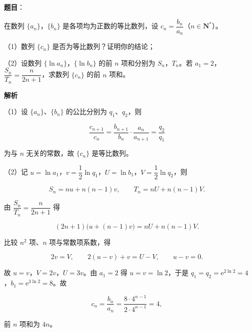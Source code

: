 \begin{answer}

\textbf{题目}：

在数列 $\{a_n\}$，$\{b_n\}$ 是各项均为正数的等比数列，设 $c_n=\dfrac{b_n}{a_n}$（$n\in\mathbf N^*$）。

（1）数列 $\{c_n\}$ 是否为等比数列？证明你的结论；

（2）设数列 $\{\ln a_n\}$，$\{\ln b_n\}$ 的前 $n$ 项和分别为 $S_n$，$T_n$。若 $a_1=2$，$\dfrac{S_n}{T_n}=\dfrac{n}{2n+1}$，求数列 $\{c_n\}$ 的前 $n$ 项和。

\textbf{解析}

（1）设 $\{a_n\}$、$\{b_n\}$ 的公比分别为 $q_1$、$q_2$，则

\nopagebreak[4]
\[\frac{c_{n+1}}{c_n}=\frac{b_{n+1}}{b_n}\cdot\frac{a_n}{a_{n+1}}=\frac{q_2}{q_1}\]

为与 $n$ 无关的常数，故 $\{c_n\}$ 是等比数列。

（2）记 $u=\ln a_1$，$v=\dfrac12\ln q_1$，$U=\ln b_1$，$V=\dfrac12\ln q_2$，则

\nopagebreak[4]
\[S_n=nu+n(n-1)v,\qquad T_n=nU+n(n-1)V.\]

由 $\dfrac{S_n}{T_n}=\dfrac{n}{2n+1}$ 得

\nopagebreak[4]
\[(2n+1)\bigl(u+(n-1)v\bigr)=nU+n(n-1)V.\]

比较 $n^2$ 项、$n$ 项与常数项系数，得

\nopagebreak[4]
\[2v=V,\qquad 2(u-v)+v=U-V,\qquad u-v=0.\]

故 $u=v$，$V=2v$，$U=3v$。由 $a_1=2$ 得 $u=v=\ln2$，于是 $q_1=q_2=\mathrm e^{2\ln2}=4$，$b_1=\mathrm e^{3\ln2}=8$。故

\nopagebreak[4]
\[c_n=\frac{b_n}{a_n}=\frac{8\cdot4^{n-1}}{2\cdot4^{n-1}}=4,\]

前 $n$ 项和为 $4n$。


\end{answer}
